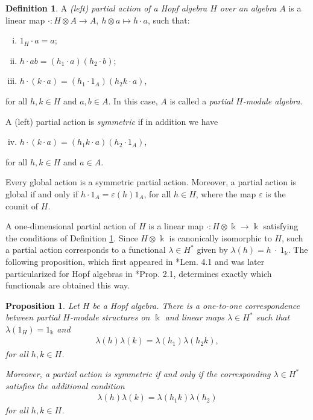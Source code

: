 \documentclass[reqno]{amsart}
\newtheorem{prop}[thm]{Proposition}
\theoremstyle{definition}
\newtheorem{definition}[thm]{Definition}
\numberwithin{equation}{section}\theoremstyle{plain}
\theoremstyle{definition}
\def \k {\Bbbk}
\begin{document}
\begin{definition} \label{partial_action}
A \emph{(left) partial action of a Hopf algebra $H$ over an algebra $A$} is a linear map $\cdot : H \otimes A \longrightarrow A,\ h \otimes a \mapsto h \cdot a$, such that:
	\begin{enumerate}[(i)]
		\item $1_H \cdot a=a$;
		\item $h\cdot ab=(h_1\cdot a)(h_2\cdot b)$;
		\item $h\cdot(k\cdot a)=(h_1\cdot 1_A)(h_2k\cdot a)$,
	\end{enumerate}
	for all $h,k\in H$ and $a,b\in A$.
	In this case, $A$ is called a \emph{partial $H$-module algebra}.

    \smallbreak
    
	A (left) partial action is \emph{symmetric} if in addition we have
	\begin{enumerate}[(i)]
        \setcounter{enumi}{3}
		\item $h \cdot ( k \cdot a)=(h_1k \cdot a)(h_2 \cdot 1_A)$,
	\end{enumerate}
	for all $h,k\in H$ and $a\in A$.
\end{definition}


Every global action is a symmetric partial action. Moreover, a partial action is global if and only if $h\cdot 1_A=\varepsilon(h)1_A$, for all $h\in H$, where the map $\varepsilon$ is the counit of $H$.

\medbreak


A one-dimensional partial action of \(H\) is a linear map \(\cdot: H \otimes \Bbbk \to \Bbbk\) satisfying the conditions of Definition \ref{partial_action}. Since \(H \otimes \Bbbk\) is canonically isomorphic to \(H\), such a partial action corresponds to a functional \(\lambda \in H^*\) given by \(\lambda(h) = h~\cdot~1_\Bbbk\). 
The following proposition, which first appeared in \cite{guris}*{Lem. 4.1} and was later particularized for Hopf algebras in \cite{corresponding}*{Prop. 2.1}, determines exactly which functionals are obtained this way.


\begin{prop}\label{k_mod_alg_parc}
	Let $H$ be a Hopf algebra.
    There is a one-to-one correspondence between partial \(H\)-module structures on \(\Bbbk\) and linear maps $\lambda \in H^*$ such that $\lambda(1_H)=1_\k$ and
	\begin{align}\label{eqn_lda}
		\lambda(h)\lambda(k)=\lambda(h_1)\lambda(h_2k),
	\end{align}
	for all $h, k \in H$. 

	Moreover, a partial action is symmetric if and only if the corresponding $\lambda \in H^*$ satisfies the additional condition
	\begin{align}\label{eqn_lda_sim}
\lambda(h)\lambda(k)=\lambda(h_1k)\lambda(h_2)
\end{align}
for all \(h, k \in H\).
\end{prop}
\end{document}
